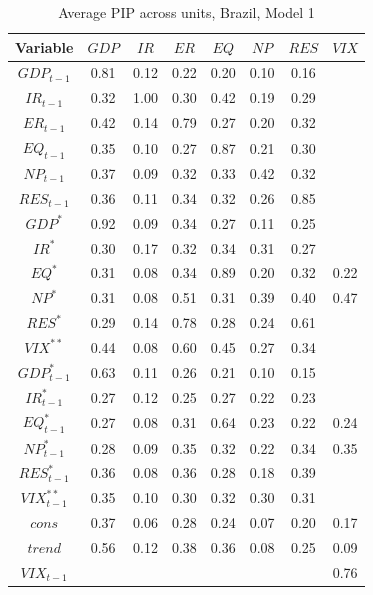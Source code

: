 \documentclass[a4paper, twoside]{templates/ociamthesis}
\begin{document}
\clearpage

\begin{table}[!ht]

\caption{\label{tab:Table55BR1}Average PIP across units, Brazil, Model 1}
\centering
\fontsize{8}{10}\selectfont
\begin{tabular}[t]{cccccccc}
\toprule
Variable & $GDP$ & $IR$ & $ER$ & $EQ$ & $NP$ & $RES$ & $VIX$\\
\midrule
$GDP_{t-1}$ & 0.81 & 0.12 & 0.22 & 0.20 & 0.10 & 0.16 & \\
$IR_{t-1}$ & 0.32 & 1.00 & 0.30 & 0.42 & 0.19 & 0.29 & \\
$ER_{t-1}$ & 0.42 & 0.14 & 0.79 & 0.27 & 0.20 & 0.32 & \\
$EQ_{t-1}$ & 0.35 & 0.10 & 0.27 & 0.87 & 0.21 & 0.30 & \\
$NP_{t-1}$ & 0.37 & 0.09 & 0.32 & 0.33 & 0.42 & 0.32 & \\
$RES_{t-1}$ & 0.36 & 0.11 & 0.34 & 0.32 & 0.26 & 0.85 & \\
$GDP^*$ & 0.92 & 0.09 & 0.34 & 0.27 & 0.11 & 0.25 & \\
$IR^*$ & 0.30 & 0.17 & 0.32 & 0.34 & 0.31 & 0.27 & \\
$EQ^*$ & 0.31 & 0.08 & 0.34 & 0.89 & 0.20 & 0.32 & 0.22\\
$NP^*$ & 0.31 & 0.08 & 0.51 & 0.31 & 0.39 & 0.40 & 0.47\\
$RES^*$ & 0.29 & 0.14 & 0.78 & 0.28 & 0.24 & 0.61 & \\
$VIX^{**}$ & 0.44 & 0.08 & 0.60 & 0.45 & 0.27 & 0.34 & \\
$GDP^*_{t-1}$ & 0.63 & 0.11 & 0.26 & 0.21 & 0.10 & 0.15 & \\
$IR^*_{t-1}$ & 0.27 & 0.12 & 0.25 & 0.27 & 0.22 & 0.23 & \\
$EQ^*_{t-1}$ & 0.27 & 0.08 & 0.31 & 0.64 & 0.23 & 0.22 & 0.24\\
$NP^*_{t-1}$ & 0.28 & 0.09 & 0.35 & 0.32 & 0.22 & 0.34 & 0.35\\
$RES^*_{t-1}$ & 0.36 & 0.08 & 0.36 & 0.28 & 0.18 & 0.39 & \\
$VIX^{**}_{t-1}$ & 0.35 & 0.10 & 0.30 & 0.32 & 0.30 & 0.31 & \\
$cons$ & 0.37 & 0.06 & 0.28 & 0.24 & 0.07 & 0.20 & 0.17\\
$trend$ & 0.56 & 0.12 & 0.38 & 0.36 & 0.08 & 0.25 & 0.09\\
$VIX_{t-1}$ &  &  &  &  &  &  & 0.76\\
\bottomrule
\end{tabular}
\end{table}
\end{document}
